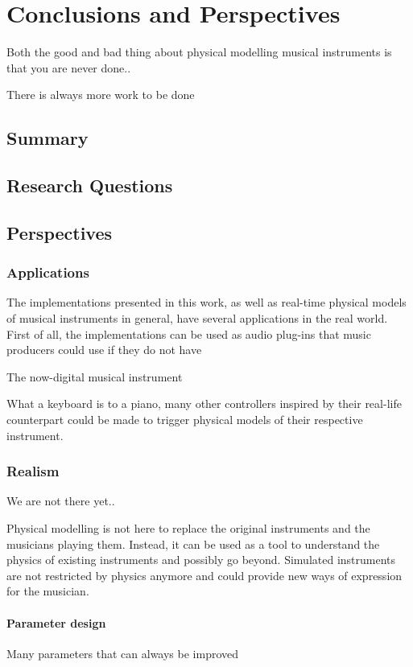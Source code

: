 \chapter{Conclusions and Perspectives}\label{ch:conclusion}
Both the good and bad thing about physical modelling musical instruments is that you are never done..

There is always more work to be done

\section{Summary}


\section{Research Questions}

\section{Perspectives}
\subsection{Applications}
The implementations presented in this work, as well as real-time physical models of musical instruments in general, have several applications in the real world. First of all, the implementations can be used as audio plug-ins that music producers could use if they do not have


The now-digital musical instrument 

What a keyboard is to a piano, many other controllers inspired by their real-life counterpart could be made to trigger physical models of their respective instrument.
\subsection{Realism}
We are not there yet.. 

Physical modelling is not here to replace the original instruments and the musicians playing them. Instead, it can be used as a tool to understand the physics of existing instruments and possibly go beyond. Simulated instruments are not restricted by physics anymore and could provide new ways of expression for the musician. 

\subsubsection{Parameter design}
Many parameters that can always be improved

